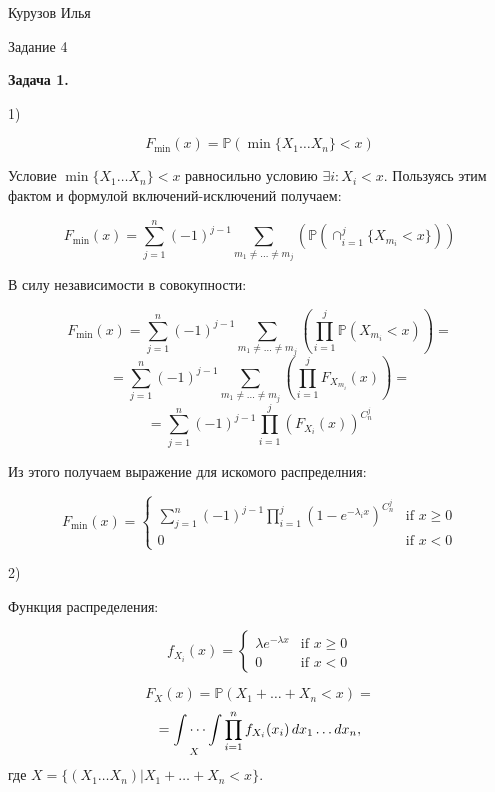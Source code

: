 \documentclass[12pt]{article}
\begin{document}
\begin{center}
{Курузов Илья}

{Задание 4}
\end{center}

\begin{center}
\textbf{Задача 1.}
\end{center}

1)

$$F_{\min}(x) = \mathbb{P}(\min\{X_1\dots X_n\}<x)$$

Условие $\min\{X_1\dots X_n\}<x$ равносильно условию $\exists i :X_i<x$. Пользуясь этим фактом и формулой включений-исключений получаем:

$$F_{\min}(x) = \sum\limits_{j = 1}^n(-1)^{j-1}\sum\limits_{m_1\neq\dots\neq m_j}\left(\mathbb{P}(\cap_{i=1}^j\{X_{m_i}<x\})\right)$$

В силу независимости в совокупности:

$$F_{\min}(x)=\sum\limits_{j = 1}^n(-1)^{j-1}\sum\limits_{m_1\neq\dots\neq m_j}\left(\prod\limits_{i=1}^j\mathbb{P}(X_{m_i}<x)\right) = $$
$$=\sum\limits_{j = 1}^n(-1)^{j-1}\sum\limits_{m_1\neq\dots\neq m_j}\left(\prod\limits_{i=1}^jF_{X_{m_i}}(x)\right)=$$
$$=\sum\limits_{j = 1}^n(-1)^{j-1}\prod\limits_{i=1}^j\left(F_{X_{i}}(x)\right)^{C_n^j}$$

Из этого получаем выражение для искомого распределния:

\begin{equation*}
\boxed{
F_{\min}(x) = 
 \begin{cases}
   \sum\limits_{j = 1}^n(-1)^{j-1}\prod\limits_{i=1}^j\left(1 - e^{-\lambda_i x}\right)^{C_n^j} &\text{if  $x \geq 0$}\\
   0 &\text{if $x<0$}
 \end{cases}
 }
\end{equation*}

2)

Функция распределения:

\begin{equation*}
f_{X_i}(x) = 
 \begin{cases}
   \lambda e^{-\lambda x} &\text{if  $x \geq 0$}\\
   0 &\text{if $x<0$}
 \end{cases}
\end{equation*}

$$F_X(x) = \mathbb{P}(X_1 + \dots + X_n<x)=$$
\[=\idotsint\limits_X \prod\limits_{i=1}^nf_{X_i}(x_i)\,dx_1\dots dx_n,\] где $X = \{(X_1\dots X_n)|X_1 + \dots + X_n<x\}$.
\end{document}
